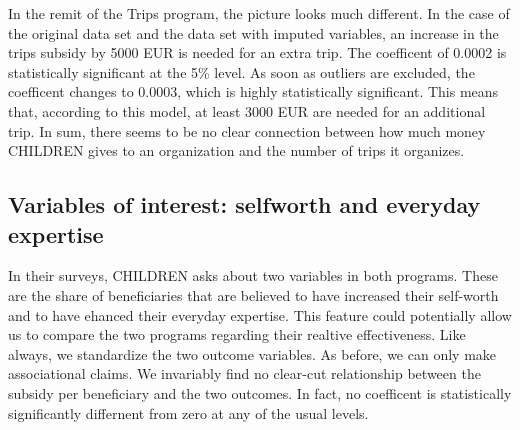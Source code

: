 \documentclass[12pt, a4paper, titlepage]{article}\usepackage[]{graphicx}\usepackage[]{color}
\begin{document}
In the remit of the Trips program, the picture looks much different. In the case of the original data set and the data set with imputed variables, an increase in the trips subsidy by 5000 EUR is needed for an extra trip. The coefficent of 0.0002 is statistically significant at the 5\% level. As soon as outliers are excluded, the coefficent changes to 0.0003, which is highly statistically significant. This means that, according to this model, at least 3000 EUR are needed for an additional trip.
In sum, there seems to be no clear connection between how much money CHILDREN gives to an organization and the number of trips it organizes. 


\usepackage{graphicx}

\begin{table}
\begin{center}
\caption{Regression Results: Number of trips}
\label{GrantsRegressionsTrips}
\end{center}
\end{table}


\subsection{Variables of interest: selfworth and everyday expertise} 

In their surveys, CHILDREN asks about two variables in both programs. These are the share of beneficiaries that are believed to have increased their self-worth and to have ehanced their everyday expertise. This feature could potentially allow us to compare the two programs regarding their realtive effectiveness. Like always, we standardize the two outcome variables. As before, we can only make associational claims. We invariably find no clear-cut relationship between the subsidy per beneficiary and the two outcomes. In fact, no coefficent is statistically significantly differnent from zero at any of the usual levels. 
\end{document}
